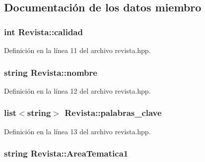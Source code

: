 \subsection{Documentación de los datos miembro}
\hypertarget{class_revista_a3771f31a8cc027b802e99e378890c818}{
\subsubsection[{calidad}]{\setlength{\rightskip}{0pt plus 5cm}int Revista\-::calidad\hspace{0.3cm}{\ttfamily [private]}}}\label{class_revista_a3771f31a8cc027b802e99e378890c818}


Definición en la línea 11 del archivo revista.\-hpp.

\hypertarget{class_revista_a8f33fc429436702dc5bdd6abff4ec9ac}{
\subsubsection[{nombre}]{\setlength{\rightskip}{0pt plus 5cm}string Revista\-::nombre\hspace{0.3cm}{\ttfamily [private]}}}\label{class_revista_a8f33fc429436702dc5bdd6abff4ec9ac}


Definición en la línea 12 del archivo revista.\-hpp.

\hypertarget{class_revista_abad6d1662e4763f4471640c8f8d5aa82}{
\subsubsection[{palabras\-\_\-clave}]{\setlength{\rightskip}{0pt plus 5cm}list$<$string$>$ Revista\-::palabras\-\_\-clave\hspace{0.3cm}{\ttfamily [private]}}}\label{class_revista_abad6d1662e4763f4471640c8f8d5aa82}


Definición en la línea 13 del archivo revista.\-hpp.

\hypertarget{class_revista_ad648f3e7381a6b8d6ab218c04a222c37}{
\subsubsection[{Area\-Tematica1}]{\setlength{\rightskip}{0pt plus 5cm}string Revista\-::\-Area\-Tematica1\hspace{0.3cm}{\ttfamily [private]}}}\label{class_revista_ad648f3e7381a6b8d6ab218c04a222c37}


